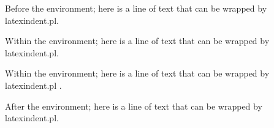 Before the environment; here
is a line of text that can be
wrapped by latexindent.pl.

\begin{myenv}
	Within the environment; here is a line of text
	that can be wrapped by latexindent.pl.
\end{myenv}

\begin{another}
	Within the
	environment;
	here is a line
	of text that
	can be wrapped
	by
	latexindent.pl
	.
\end{another}

After the environment; here
is a line of text that can be
wrapped by latexindent.pl.
